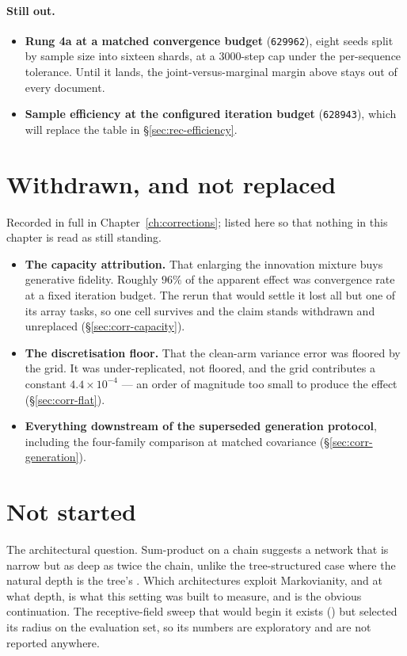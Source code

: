 \paragraph{Still out.}
\begin{itemize}\itemsep3pt
\item \textbf{Rung 4a at a matched convergence budget} (\texttt{629962}), eight seeds split by
      sample size into sixteen shards, at a $3000$-step cap under the per-sequence tolerance. Until
      it lands, the joint-versus-marginal margin above stays out of every document.
\item \textbf{Sample efficiency at the configured iteration budget} (\texttt{628943}), which will
      replace the table in \S\ref{sec:rec-efficiency}.
\end{itemize}

\section{Withdrawn, and not replaced}

Recorded in full in Chapter~\ref{ch:corrections}; listed here so that nothing in this chapter is
read as still standing.

\begin{itemize}\itemsep3pt
\item \textbf{The capacity attribution.} That enlarging the innovation mixture buys generative
      fidelity. Roughly $96\%$ of the apparent effect was convergence rate at a fixed iteration
      budget. The rerun that would settle it lost all but one of its array tasks, so one cell
      survives and the claim stands withdrawn and unreplaced (\S\ref{sec:corr-capacity}).
\item \textbf{The discretisation floor.} That the clean-arm variance error was floored by the
      grid. It was under-replicated, not floored, and the grid contributes a constant
      $4.4\times10^{-4}$ --- an order of magnitude too small to produce the effect
      (\S\ref{sec:corr-flat}).
\item \textbf{Everything downstream of the superseded generation protocol}, including the
      four-family comparison at matched covariance (\S\ref{sec:corr-generation}).
\end{itemize}

\section{Not started}

The architectural question. Sum-product on a chain suggests a network that is narrow but as deep
as twice the chain, unlike the tree-structured case where the natural depth is the tree's
\citep{mei2024unet,garnierbrun2024transformers}. Which architectures exploit Markovianity, and at
what depth, is what this setting was built to measure, and is the obvious continuation. The
receptive-field sweep that would begin it exists () but selected its radius on
the evaluation set, so its numbers are exploratory and are not reported anywhere.
